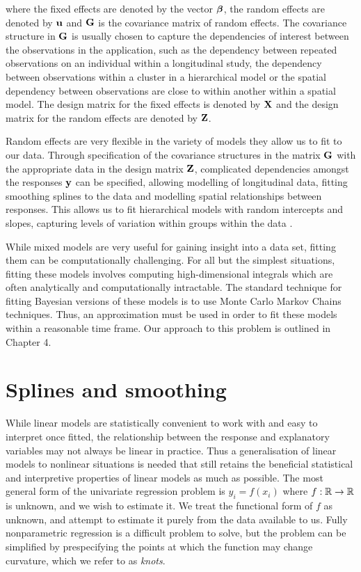 \noindent 
where the fixed effects are denoted by the vector ${\boldsymbol \beta}$, the random effects
are denoted by ${\bf u}$ and ${\bf G}$ is the covariance matrix of random effects. The
covariance structure in ${\bf G}$ is usually chosen to capture the dependencies of
interest between the observations in the application, such as the dependency
between repeated observations on an individual within a longitudinal study, the
dependency between observations within a cluster in a hierarchical model or the
spatial dependency between observations are close to within another within a
spatial model. The design matrix for the fixed effects is denoted by ${\bf X}$ and
the design matrix for the random effects are denoted by ${\bf Z}$.

Random effects are very flexible in the variety of models they allow us to fit
to our data. Through specification of the covariance structures in the matrix
${\bf G}$ with the appropriate data in the design matrix ${\bf Z}$, complicated
dependencies amongst the responses ${\bf y}$ can be specified, allowing modelling of
longitudinal data, fitting smoothing splines to the data and modelling spatial
relationships between responses. This allows us to fit hierarchical models with
random intercepts and slopes, capturing levels of variation within groups within
the data \citep{Gelman2007}.

While mixed models are very useful for gaining insight into a data set, fitting
them can be computationally challenging. For all but the simplest situations,
fitting these models involves computing high-dimensional integrals which are
often analytically and computationally intractable. The standard technique for
fitting Bayesian versions of these models is to use Monte Carlo Markov Chains
techniques. Thus, an approximation must be used in order to fit these models
within a reasonable time frame. Our approach to this problem is outlined in
Chapter 4.

\section{Splines and smoothing}

While linear models are statistically convenient to work with and easy to
interpret once fitted, the relationship between the response and explanatory
variables may not always be linear in practice. Thus a generalisation of linear
models to nonlinear situations is needed that still retains the beneficial
statistical and interpretive properties of linear models as much as possible.
The most general form of the univariate regression problem is
$ y_i = f(x_i) $
where $f: {\mathbb{R}} \to {\mathbb{R}}$ is unknown, and we wish to estimate it. We treat
the functional form of $f$ as unknown, and attempt to estimate it purely from
the data available to us. Fully nonparametric regression is a difficult problem
to solve, but the problem can be simplified by prespecifying the points at
which the function may change curvature, which we refer to as \emph{knots}.

